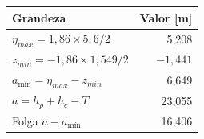 \begin{tabular}{lr}
\toprule
Grandeza & Valor [m] \\
\midrule
$\eta_{max} = 1{,}86 \times 5{,}6/2$ & 5,208 \\
$z_{min} = -1{,}86 \times 1,549/2$ & $-1,441$ \\
$a_{\text{mín}} = \eta_{max} - z_{min}$ & 6,649 \\
$a = h_p + h_c - T$ & 23,055 \\
Folga $a - a_{\text{mín}}$ & 16,406 \\
\bottomrule
\end{tabular}
